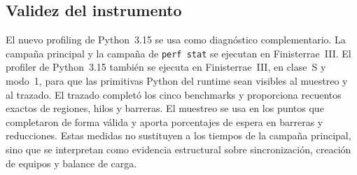 \subsection{Validez del instrumento}
El nuevo profiling de Python~3.15 se usa como diagnóstico complementario. La
campaña principal y la campaña de \texttt{perf stat} se ejecutan en
Finisterrae~III. El profiler de Python~3.15 también se ejecuta en
Finisterrae~III, en clase~S y modo~1, para que las primitivas Python del runtime
sean visibles al muestreo y al trazado. El trazado completó los cinco benchmarks
y proporciona recuentos exactos de regiones, hilos y barreras. El muestreo se
usa en los puntos que completaron de forma válida y aporta porcentajes de espera
en barreras y reducciones. Estas medidas no sustituyen a los tiempos de la
campaña principal, sino que se interpretan como evidencia estructural sobre
sincronización, creación de equipos y balance de carga.
